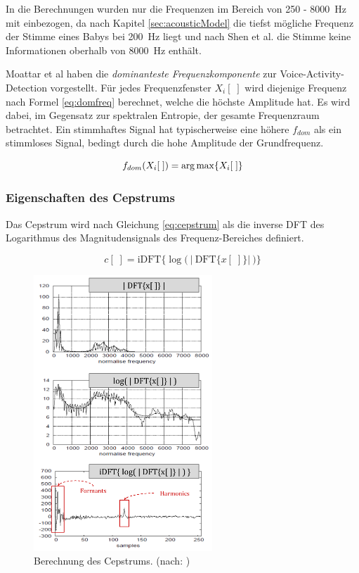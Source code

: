 In die Berechnungen wurden nur die Frequenzen im Bereich von 250 - \SI{8000}{\hertz} mit einbezogen, da nach Kapitel \ref{sec:acousticModel} die tiefst mögliche Frequenz der Stimme eines Babys bei \SI{200}{\hertz} liegt und nach Shen et al. \cite{vad_entropie02} die Stimme keine Informationen oberhalb von \SI{8000}{\hertz} enthält.

Moattar et al \cite[S. 2550]{vad_Easy} haben die \emph{dominanteste Frequenzkomponente} zur Voice-Activity-Detection vorgestellt. Für jedes Frequenzfenster $X_i[\;]$ wird diejenige Frequenz nach Formel \ref{eq:domfreq} berechnet, welche die höchste Amplitude hat. Es wird dabei, im Gegensatz zur spektralen Entropie, der gesamte Frequenzraum betrachtet. Ein stimmhaftes Signal hat typischerweise eine höhere $f_{dom}$ als ein stimmloses Signal, bedingt durch die hohe Amplitude der Grundfrequenz.

\begin{equation}
f_{dom}(X_i[\;]) = \operatorname*{arg\,max} \{X_i[\;]\}
\label{eq:domfreq}
\end{equation}


\subsubsection{Eigenschaften des Cepstrums}
\label{sec:vad_ceps_features}

Das Cepstrum wird nach Gleichung \ref{eq:cepstrum} als die inverse DFT des Logarithmus des Magnitudensignals des Frequenz-Bereiches definiert.\cite[Cepstral analysis]{ricardo_ceps}

\begin{equation}
c[\;] =  \text{iDFT}\Big\{ \log \Big(\ \big|\ \text{DFT}\{x[\;]\} \big|\ \Big) \Big\}
\label{eq:cepstrum}
\end{equation}	

\begin{figure}[H]
	\centering
	\includegraphics[width=0.6\textwidth]{bilder/cepstrum04.png}
	\caption{Berechnung des Cepstrums. (nach: \cite[Cepstral Analysis, S. 3]{ricardo_ceps})}
	\label{img:cepstrumOverview}
\end{figure}

